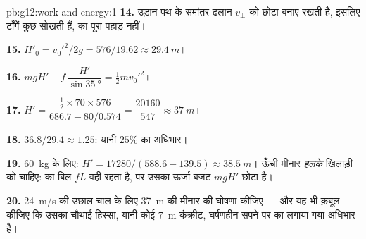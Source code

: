 \begin{solution}{pb:g12:work-and-energy:1}
\textbf{14.} उड़ान-पथ के समांतर ढलान $v_\perp$ को छोटा बनाए रखती है, इसलिए
टाँगें कुछ  सोखती हैं,  का पूरा पहाड़ नहीं।

\textbf{15.} $H'_0 = v_0'^2/2g = 576/19.62 \approx \qty{29.4}{m}$।

\textbf{16.} $mgH' - f\,\dfrac{H'}{\sin\qty{35}{\degree}} =
\tfrac12 m v_0'^2$।

\textbf{17.} $H' = \dfrac{\tfrac12 \times 70 \times 576}
{686.7 - 80/0.574} = \dfrac{\num{20160}}{547} \approx \qty{37}{m}$।

\textbf{18.} $36.8/29.4 \approx 1.25$: यानी $25\%$ का अधिभार।

\textbf{19.} \qty{60}{kg} के लिए: $H' = \num{17280}/(588.6 - 139.5)
\approx \qty{38.5}{m}$। ऊँची मीनार \emph{हलके} खिलाड़ी को चाहिए:
 का बिल $fL$ वही रहता है, पर उसका ऊर्जा-बजट $mgH'$
छोटा है।

\textbf{20.} \qty{24}{m/s} की उछाल-चाल के लिए \qty{37}{m} की मीनार की घोषणा कीजिए ---
और यह भी क़बूल कीजिए कि उसका चौथाई हिस्सा, यानी कोई \qty{7}{m} कंक्रीट,
घर्षणहीन सपने पर  का लगाया गया अधिभार है।
\end{solution}
